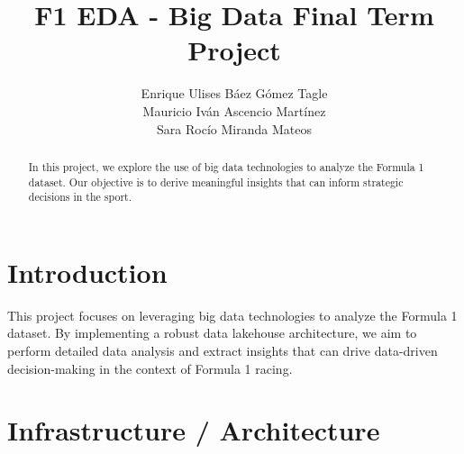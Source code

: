 \documentclass{article}
\begin{document}
\title{F1 EDA - Big Data Final Term Project}

\author{Enrique Ulises Báez Gómez Tagle \\ Mauricio Iván Ascencio Martínez\\ Sara Rocío Miranda Mateos}

\maketitle

\begin{abstract}
In this project, we explore the use of big data technologies to analyze the Formula 1 dataset. Our objective is to derive meaningful insights that can inform strategic decisions in the sport.
\end{abstract}

\tableofcontents
\newpage

\section{Introduction}
This project focuses on leveraging big data technologies to analyze the Formula 1 dataset. By implementing a robust data lakehouse architecture, we aim to perform detailed data analysis and extract insights that can drive data-driven decision-making in the context of Formula 1 racing.

\section{Infrastructure / Architecture}
\end{document}
